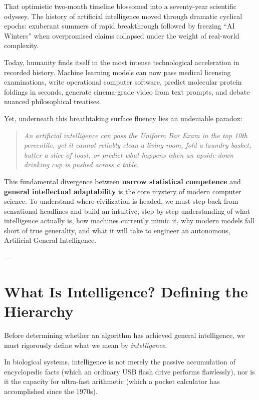 \documentclass[11pt,journal,onecolumn]{IEEEtran}
\begin{document}
That optimistic two-month timeline blossomed into a seventy-year scientific odyssey. The history of artificial intelligence moved through dramatic cyclical epochs: exuberant summers of rapid breakthrough followed by freezing ``AI Winters'' when overpromised claims collapsed under the weight of real-world complexity.

Today, humanity finds itself in the most intense technological acceleration in recorded history. Machine learning models can now pass medical licensing examinations, write operational computer software, predict molecular protein foldings in seconds, generate cinema-grade video from text prompts, and debate nuanced philosophical treatises.

Yet, underneath this breathtaking surface fluency lies an undeniable paradox:
\begin{quote}
\textit{An artificial intelligence can pass the Uniform Bar Exam in the top 10th percentile, yet it cannot reliably clean a living room, fold a laundry basket, butter a slice of toast, or predict what happens when an upside-down drinking cup is pushed across a table.}
\end{quote}

This fundamental divergence between \textbf{narrow statistical competence} and \textbf{general intellectual adaptability} is the core mystery of modern computer science. To understand where civilization is headed, we must step back from sensational headlines and build an intuitive, step-by-step understanding of what intelligence actually is, how machines currently mimic it, why modern models fall short of true generality, and what it will take to engineer an autonomous, Artificial General Intelligence.

---

\section{What Is Intelligence? Defining the Hierarchy}
\label{sec:hierarchy}

Before determining whether an algorithm has achieved general intelligence, we must rigorously define what we mean by \textit{intelligence}. 

In biological systems, intelligence is not merely the passive accumulation of encyclopedic facts (which an ordinary USB flash drive performs flawlessly), nor is it the capacity for ultra-fast arithmetic (which a pocket calculator has accomplished since the 1970s).

\vspace{0.3em}
\noindent{}
\vspace{0.3em}
\end{document}
